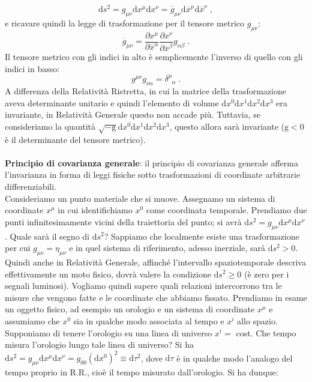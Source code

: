 \documentclass[12pt,a4paper]{report}
\theoremstyle{definition}
\newcommand{\diff}[1][]{\mathrm{d}#1}
\begin{document}
$$
\diff{s^2}=g_{\mu\nu}\diff{x^{\mu}}\diff{x^{\nu}}=\overline{g}_{\mu\nu}\diff{\overline{x}^{\mu}}\diff{\overline{x}^{\nu}}\;,
$$
e ricavare quindi la legge di trasformazione per il tensore metrico $g_{\mu\nu}$:
\begin{equation}
\overline{g}_{\mu\nu}=\frac{\partial x^{\mu}}{\partial\overline{x}^{\alpha}}\frac{\partial x^{\nu}}{\partial\overline{x}^{\beta}}g_{\alpha\beta}\;.
\end{equation}
Il tensore metrico con gli indici in alto è semplicemente l'inverso di quello con gli indici in basso:
\begin{equation}
g^{\mu\nu}g_{\nu\alpha}=\delta^{\mu}_{\;\;\alpha}\;.
\end{equation}
A differenza della Relatività Ristretta, in cui la matrice della trasformazione aveva determinante unitario e quindi l'elemento di volume $\diff{x^0}\diff{x^1}\diff{x^2}\diff{x^3}$ era invariante, in Relatività Generale questo non accade più. Tuttavia, se consideriamo la quantità $\sqrt{-\mathrm{g}}\diff{x^0}\diff{x^1}\diff{x^2}\diff{x^3}$, questo allora sarà invariante ($\mathrm{g}<0$ è il determinante del tensore metrico). \\
\\
\textbf{Principio di covarianza generale}: il principio di covarianza generale afferma l'invarianza in forma di leggi fisiche sotto trasformazioni di coordinate arbitrarie differenziabili. \\
Consideriamo un punto materiale che si muove. Assegnamo un sistema di coordinate $x^{\mu}$ in cui identifichiamo $x^0$ come coordinata temporale. Prendiamo due punti infinitesimamente vicini della traiettoria del punto; si avrà $\diff{s^2}=g_{\mu\nu}\diff{x^{\mu}}\diff{x^{\nu}}$. Quale sarà il segno di $\diff{s^2}$? Sappiamo che localmente esiste una trasformazione per cui $g_{\mu\nu}=\eta_{\mu\nu}$ e in quel sistema di riferimento, adesso inerziale, sarà $\diff{s^2}>0$. Quindi anche in Relatività Generale, affinché l'intervallo spaziotemporale descriva effettivamente un moto fisico, dovrà valere la condizione $\diff{s^2}\ge 0$ (è zero per i segnali luminosi). Vogliamo quindi sapere quali relazioni intercorrono tra le misure che vengono fatte e le coordinate che abbiamo fissato. Prendiamo in esame un oggetto fisico, ad esempio un orologio e un sistema di coordinate $x^{\mu}$ e assumiamo che $x^0$ sia in qualche modo associata al tempo e $x^i$ allo spazio. Supponiamo di tenere l'orologio su una linea di universo $x^i=$ cost. Che tempo misura l'orologio lungo tale linea di universo? Si ha $\diff{s^2}=g_{\mu\nu}\diff{x^{\mu}}\diff{x^{\nu}}=g_{00}(\diff{x^0})^2\equiv\diff{\tau^2}$, dove $\diff{\tau}$ è in qualche modo l'analogo del tempo proprio in R.R., cioè il tempo misurato dall'orologio. Si ha dunque:
\end{document}

